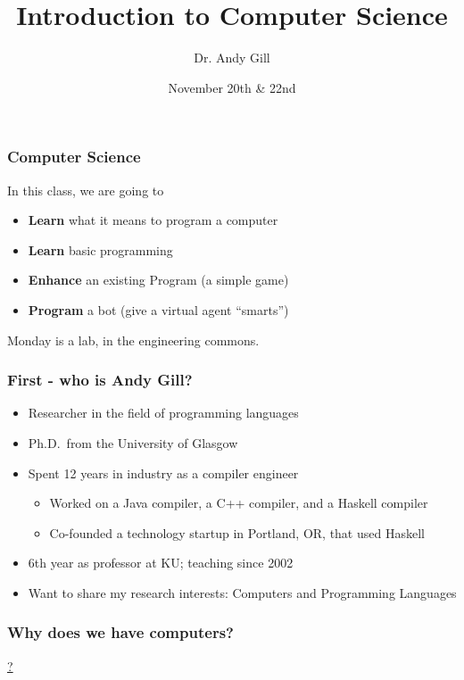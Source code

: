 \documentclass{beamer}
\title[CS]{Introduction to Computer Science}
\author[Andy Gill]{Dr. Andy Gill}
\institute{Electrical Engineering and Computer Science}
\date{November 20th \& 22nd}
\begin{document}
\frame{\titlepage}

\begin{frame}
\frametitle{Computer Science}
\Large

In this class, we are going to

\frameskip{}
\begin{itemize}
\item {\bf Learn} what it means to program a computer
\item {\bf Learn} basic programming
\item {\bf Enhance} an existing Program (a simple game)
\item {\bf Program} a bot (give a virtual agent ``smarts'')
\end{itemize}
\frameskip{}

Monday is a lab, in the engineering commons.
\end{frame}


\begin{frame}
\frametitle{First - who is Andy Gill?}
\Large

\begin{itemize}
\item Researcher in the field of programming languages
\item Ph.D.\ from the University of Glasgow
\item Spent 12 years in industry as a compiler engineer
\begin{itemize}
\item Worked on a Java compiler, a C++ compiler, and a Haskell compiler 
\item Co-founded a technology startup in Portland, OR, that used Haskell
\end{itemize}
\item 6th year as professor at KU; teaching since 2002
\item Want to share my research interests: Computers and Programming Languages
\end{itemize}

\end{frame}

\begin{frame}
\frametitle{Why does we have computers?}
\Large

\begin{center}
\href{/Users/andy/git/github/engr108/slides/JobsBike.mov}{?}
\end{center}

\end{frame}
\end{document}
